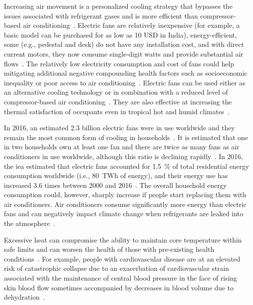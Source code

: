 Increasing air movement is a personalized cooling strategy that bypasses the issues associated with refrigerant gases and is more efficient than compressor-based air conditioning~\cite{Morris2021a}.
Electric fans are relatively inexpensive (for example, a basic model can be purchased for as low as 10 USD in India), energy-efficient, some (e.g., pedestal and desk) do not have any installation cost, and with direct current motors, they now consume single-digit watts and provide substantial air flows~\cite{Yang2015a}.
The relatively low electricity consumption and cost of fans could help mitigating additional negative compounding health factors such as socioeconomic inequality or poor access to air conditioning~\cite{Morris2021a}.
Electric fans can be used either as an alternative cooling technology or in combination with a reduced level of compressor-based air conditioning~\cite{Jay2019a, Hoyt2015, Schiavon2008}.
They are also effective at increasing the thermal satisfaction of occupants even in tropical hot and humid climates~\cite{Lipczynska2018a}.

In 2016, an estimated 2.3 billion electric fans were in use worldwide and they remain the most common form of cooling in households~\cite{IEA2018}.
It is estimated that one in two households own at least one fan and there are twice as many fans as air conditioners in use worldwide, although this ratio is declining rapidly~\cite{IEA2018}.
In 2016, the \ac{iea} estimated that electric fans accounted for 1.5~\% of total residential energy consumption worldwide (i.e., 80~TWh of energy), and their energy use has increased 3.6 times between 2000 and 2016~\cite{IEA2018}.
The overall household energy consumption could, however, sharply increase if people start replacing them with air conditioners.
Air conditioners consume significantly more energy than electric fans and can negatively impact climate change when refrigerants are leaked into the atmosphere~\cite{IEA2018}.

Excessive heat can compromise the ability to maintain core temperature within safe limits and can worsen the health of those with pre-existing health conditions~\cite{WMO2015}.
For example, people with cardiovascular disease are at an elevated risk of catastrophic collapse due to an exacerbation of cardiovascular strain associated with the maintenance of central blood pressure in the face of rising skin blood flow sometimes accompanied by decreases in blood volume due to dehydration~\cite{Morris2021a}.

